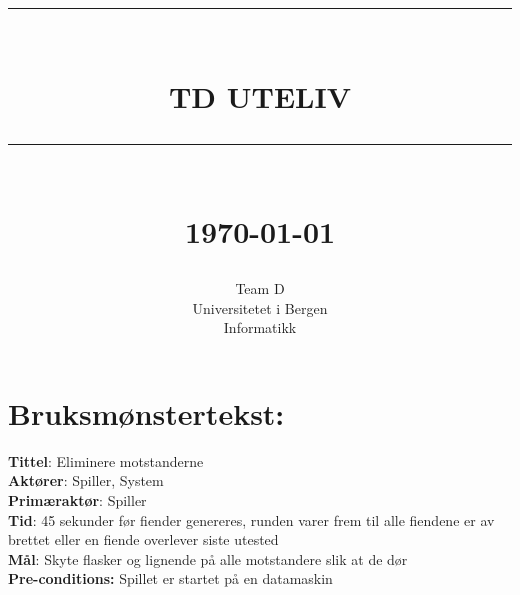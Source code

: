 \documentclass[12pt]{report}
\newcommand{\HRule}[1]{\rule{\linewidth}{#1}}
\begin{document}
\title{ \normalsize \textsc{}
		\\ [2.0cm]
		\HRule{0.5pt} \\
		\LARGE \textbf{\uppercase{TD Uteliv }}
		\HRule{2pt} \\ [0.5cm]
		\normalsize \today \vspace*{5\baselineskip}}
\date{}
\author{
		Team D  \\ 
		Universitetet i Bergen \\
		Informatikk }
\maketitle
\tableofcontents
\newpage
\section*{Bruksm{\o}nstertekst:}
\textbf{Tittel}: Eliminere motstanderne
\bigskip \\
\textbf{Akt{\o}rer}: Spiller, System
\bigskip \\
\textbf{Prim{\ae}rakt{\o}r}: Spiller
\bigskip \\
\textbf{Tid}: 45 sekunder før fiender genereres, runden varer frem til alle fiendene er av brettet eller en fiende overlever siste utested 
\bigskip \\
\textbf{M{\aa}l}: Skyte flasker og lignende på alle motstandere slik at de dør
\bigskip \\
\textbf{Pre-conditions:} Spillet er startet p{\aa} en datamaskin
\end{document}
